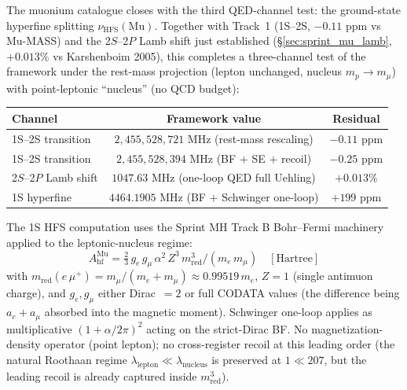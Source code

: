 \documentclass[11pt]{article}
\begin{document}
The muonium catalogue closes with the third QED-channel test: the
ground-state hyperfine splitting $\nu_\text{HFS}(\text{Mu})$.  Together
with Track~1 (1S--2S, $-0.11$ ppm vs Mu-MASS) and the 2$S$--2$P$ Lamb
shift just established (\S\ref{sec:sprint_mu_lamb}, $+0.013\%$ vs
Karshenboim 2005), this completes a three-channel test of the framework
under the rest-mass projection (lepton unchanged, nucleus
$m_p \to m_\mu$) with point-leptonic ``nucleus'' (no QCD budget):

\begin{center}
\begin{tabular}{lcc}
\toprule
Channel & Framework value & Residual \\
\midrule
1S--2S transition  & $2{,}455{,}528{,}721$ MHz (rest-mass rescaling) & $-0.11$ ppm \\
1S--2S transition  & $2{,}455{,}528{,}394$ MHz (BF $+$ SE $+$ recoil) & $-0.25$ ppm \\
2$S$--2$P$ Lamb shift & $1047.63$ MHz (one-loop QED full Uehling) & $+0.013\%$ \\
1S hyperfine & $4464.1905$ MHz (BF $+$ Schwinger one-loop) & $+199$ ppm \\
\bottomrule
\end{tabular}
\end{center}

The 1S HFS computation uses the Sprint MH Track B Bohr--Fermi machinery
applied to the leptonic-nucleus regime:
\begin{equation}
A_\text{hf}^\text{Mu}
= \tfrac{2}{3}\, g_e\, g_\mu\, \alpha^2\, Z^3\, m_\text{red}^3
  / (m_e\, m_\mu)\quad [\text{Hartree}]
\label{eq:mu_hfs_bf}
\end{equation}
with $m_\text{red}(e\,\mu^+) = m_\mu / (m_e + m_\mu) \approx
0.99519\, m_e$, $Z=1$ (single antimuon charge), and $g_e, g_\mu$ either
Dirac~$=2$ or full CODATA values (the difference being $a_e + a_\mu$
absorbed into the magnetic moment).  Schwinger one-loop applies as
multiplicative $(1 + \alpha/2\pi)^2$ acting on the strict-Dirac BF.
No magnetization-density operator (point lepton); no cross-register
recoil at this leading order (the natural Roothaan regime
$\lambda_\text{lepton} \ll \lambda_\text{nucleus}$ is preserved at
$1 \ll 207$, but the leading recoil is already captured inside
$m_\text{red}^3$).
\end{document}
